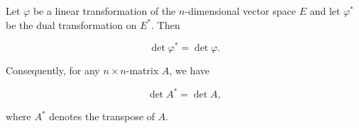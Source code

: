 Let $\varphi$ be a linear transformation of the $n$-dimensional vector space $E$ and let $\varphi^*$ be the dual transformation on $E^*$. Then

$$\det \varphi^* = \det \varphi.$$

Consequently, for any $n \times n$-matrix $A$, we have

$$\det A^* = \det A,$$

where $A^*$ denotes the transpose of $A$.
